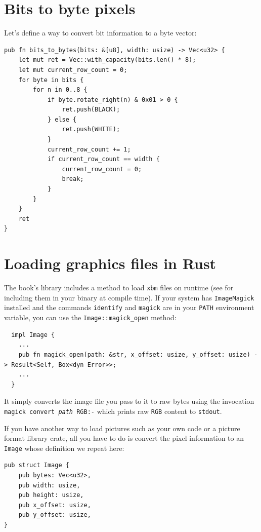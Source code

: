 \documentclass[12pt,openany,a4,usenames,dvipsnames]{book}
\newcommand\pixels{{\pixelfont{}pixels}}
\newcommand\Rust{{\fira{}\textbf{Rust}}}
\begin{document}
\chapter{Bits to byte \pixels{}}
Let's define a way to convert bit information to a byte vector:

\begin{verbatim}
pub fn bits_to_bytes(bits: &[u8], width: usize) -> Vec<u32> {
    let mut ret = Vec::with_capacity(bits.len() * 8);
    let mut current_row_count = 0;
    for byte in bits {
        for n in 0..8 {
            if byte.rotate_right(n) & 0x01 > 0 {
                ret.push(BLACK);
            } else {
                ret.push(WHITE);
            }
            current_row_count += 1;
            if current_row_count == width {
                current_row_count = 0;
                break;
            }
        }
    }
    ret
}
\end{verbatim}

\chapter{Loading graphics files in \Rust{}}
The book's library includes a method to load \texttt{xbm} files on runtime (see \emph{} for including them in your binary at compile time). If your system has \texttt{ImageMagick} installed and the commands \texttt{identify} and \texttt{magick} are in your \texttt{PATH} environment variable, you can use the \texttt{Image::magick\_open} method:

\begin{verbatim}
  impl Image {
    ...
    pub fn magick_open(path: &str, x_offset: usize, y_offset: usize) -> Result<Self, Box<dyn Error>>;
    ...
  }
\end{verbatim}

It simply converts the image file you pass to it to raw bytes using the invocation \texttt{magick convert \emph{path} RGB:-} which prints raw \texttt{RGB} content to \texttt{stdout}.

If you have another way to load pictures such as your own code or a picture format library crate, all you have to do is convert the pixel information to an \texttt{Image} whose definition we repeat here:

\begin{verbatim}
pub struct Image {
    pub bytes: Vec<u32>,
    pub width: usize,
    pub height: usize,
    pub x_offset: usize,
    pub y_offset: usize,
}
\end{verbatim}
\end{document}
